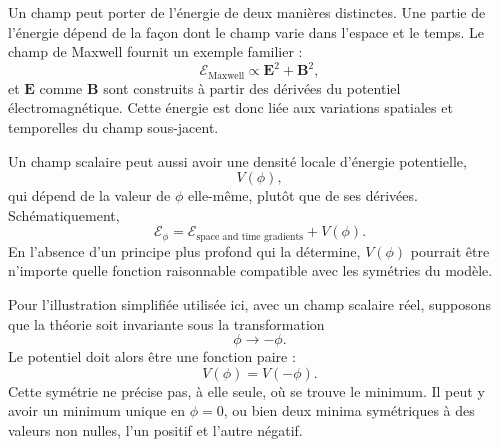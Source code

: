 \begin{classroomqa}
\end{classroomqa}

\begin{classroomqa}
\end{classroomqa}

Un champ peut porter de l’énergie de deux manières distinctes. Une partie de l’énergie dépend de la façon dont le champ varie dans l’espace et le temps. Le champ de Maxwell fournit un exemple familier :
\begin{equation}
\mathcal{E}_{\mathrm{Maxwell}}\propto \mathbf E^2+\mathbf B^2,
\end{equation}
et \(\mathbf E\) comme \(\mathbf B\) sont construits à partir des dérivées du potentiel électromagnétique. Cette énergie est donc liée aux variations spatiales et temporelles du champ sous-jacent.

Un champ scalaire peut aussi avoir une densité locale d’énergie potentielle,
\begin{equation}
V(\phi),
\end{equation}
qui dépend de la valeur de \(\phi\) elle-même, plutôt que de ses dérivées. Schématiquement,
\begin{equation}
\mathcal{E}_\phi
=
\mathcal E_{\text{space and time gradients}}+V(\phi).
\end{equation}
En l’absence d’un principe plus profond qui la détermine, \(V(\phi)\) pourrait être n’importe quelle fonction raisonnable compatible avec les symétries du modèle.

Pour l’illustration simplifiée utilisée ici, avec un champ scalaire réel, supposons que la théorie soit invariante sous la transformation
\begin{equation}
\phi\longrightarrow-\phi.
\end{equation}
Le potentiel doit alors être une fonction paire :
\begin{equation}
V(\phi)=V(-\phi).
\end{equation}
Cette symétrie ne précise pas, à elle seule, où se trouve le minimum. Il peut y avoir un minimum unique en \(\phi=0\), ou bien deux minima symétriques à des valeurs non nulles, l’un positif et l’autre négatif.

